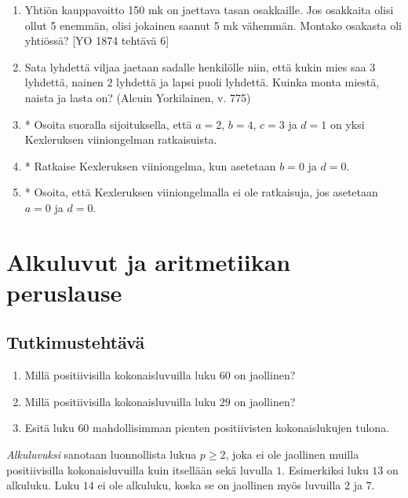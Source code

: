 \begin{enumerate}
\item Yhtiön kauppavoitto 150 mk on jaettava tasan osakkaille. Jos osakkaita olisi ollut 5 enemmän, olisi jokainen saanut 5 mk vähemmän. Montako osakasta oli yhtiössä? 
[YO 1874 tehtävä 6]

\item Sata lyhdettä viljaa jaetaan sadalle henkilölle niin, että kukin mies saa $3$ lyhdettä, nainen $2$ lyhdettä ja lapsi puoli lyhdettä. Kuinka monta miestä, naista ja lasta on? (Alcuin Yorkilainen, v. 775)

\item * %
Osoita suoralla sijoituksella, että $a=2$, $b=4$, $c=3$ ja $d=1$ on yksi Kexleruksen viiniongelman ratkaisuista.

\item * %
Ratkaise Kexleruksen viiniongelma, kun asetetaan $b=0$ ja $d=0$.

\item * %
Osoita, että Kexleruksen viiniongelmalla ei ole ratkaisuja, jos asetetaan $a=0$ ja $d=0$.

\end{enumerate}


\newpage


\section{Alkuluvut ja aritmetiikan peruslause}

\subsection*{Tutkimustehtävä}
\begin{enumerate}
\item Millä positiivisilla kokonaisluvuilla luku $60$ on jaollinen?
\item Millä positiivisilla kokonaisluvuilla luku $29$ on jaollinen?
\item Esitä luku $60$ mahdollisimman pienten positiivisten kokonaislukujen tulona.
\end{enumerate}

{\em Alkuluvuksi} sanotaan luonnollista lukua $p\ge 2$, joka ei ole jaollinen muilla positiivisilla kokonaisluvuilla kuin itsellään sekä luvulla $1$. Esimerkiksi luku $13$ on alkuluku. Luku $14$ ei ole alkuluku, koska se on jaollinen myös luvuilla $2$ ja $7$.

